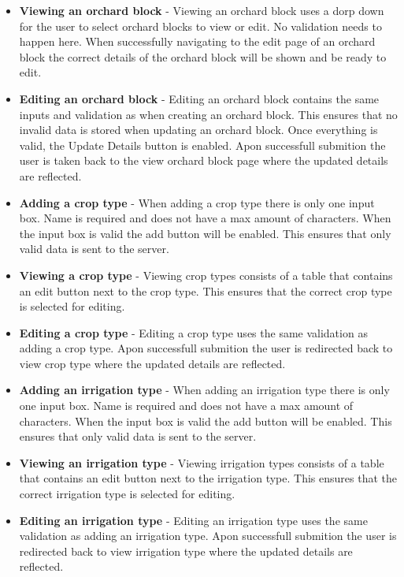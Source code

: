 \documentclass[11pt,fleqn]{book} %
\begin{document}
\begin{itemize}
				\item\textbf{Viewing an orchard block} -
				Viewing an orchard block uses a dorp down for the user to select orchard blocks to view or edit. No validation needs to happen here. When successfully navigating to the edit page of an orchard block the correct details of the orchard block will be shown and be ready to edit.
				
				\item\textbf{Editing an orchard block} -
				Editing an orchard block contains the same inputs and validation as when creating an orchard block. This ensures that no invalid data is stored when updating an orchard block. Once everything is valid, the Update Details button is enabled. Apon successfull submition the user is taken back to the view orchard block page where the updated details are reflected.							
				
				\item \textbf{Adding a crop type} -
				When adding a crop type there is only one input box. Name is required and does not have a max amount of characters. When the input box is valid the add button will be enabled. This ensures that only valid data is sent to the server.
				
				\item \textbf{Viewing a crop type} -
				Viewing crop types consists of a table that contains an edit button next to the crop type. This ensures that the correct crop type is selected for editing.
				
				\item \textbf{Editing a crop type} -
				Editing a crop type uses the same validation as adding a crop type. Apon successfull submition the user is redirected back to view crop type where the updated details are reflected.
				
				\item \textbf{Adding an irrigation type} -
				When adding an irrigation type there is only one input box. Name is required and does not have a max amount of characters. When the input box is valid the add button will be enabled. This ensures that only valid data is sent to the server.
				
				\item \textbf{Viewing an irrigation type} -
				Viewing irrigation types consists of a table that contains an edit button next to the irrigation type. This ensures that the correct irrigation type is selected for editing.
				
				\item \textbf{Editing an irrigation type} -
				Editing an irrigation type uses the same validation as adding an irrigation type. Apon successfull submition the user is redirected back to view irrigation type where the updated details are reflected.
				

\end{itemize}
\end{document}
